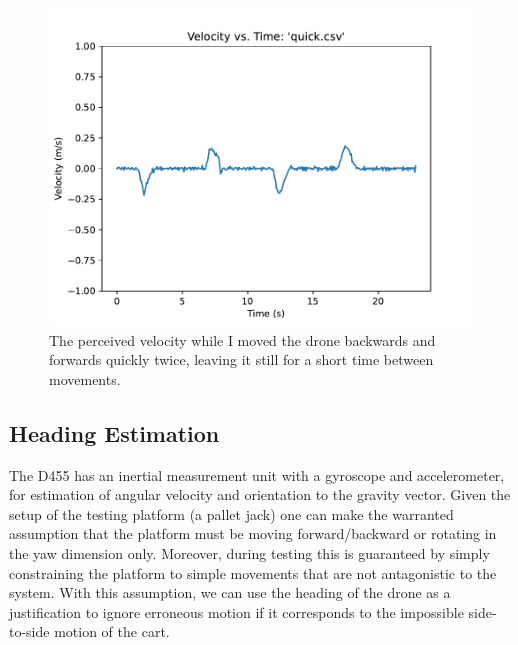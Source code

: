 \begin{figure}
	\centering
	\includegraphics[width=\linewidth]{./images/quick.pdf}
	\caption{The perceived velocity while I moved the drone backwards and forwards quickly twice, leaving it still for a short time between movements.}
	\label{figure:d455_velocity_quick}
\end{figure}

\subsection{Heading Estimation}
\label{section:heading_estimation}

The D455 has an inertial measurement unit with a gyroscope and accelerometer,
for estimation of angular velocity and orientation to the gravity vector.
Given the setup of the testing platform (a pallet jack) one can make the warranted assumption
that the platform must be moving forward/backward or rotating in the yaw dimension only.
Moreover, during testing this is guaranteed by simply constraining the platform to simple movements
that are not antagonistic to the system.
With this assumption, we can use the heading of the drone as a justification to ignore erroneous
motion if it corresponds to the impossible side-to-side motion of the cart.

